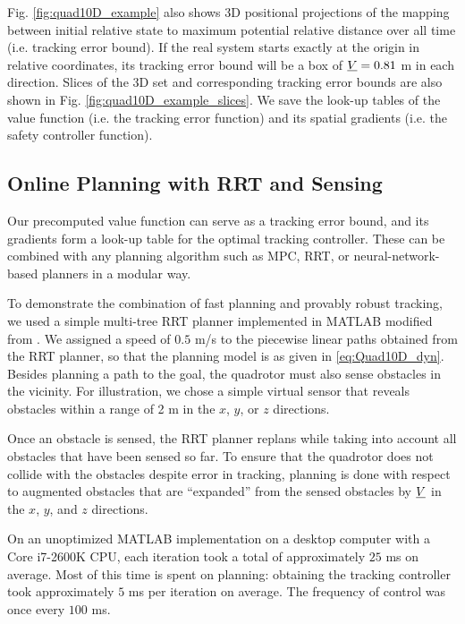 Fig. \ref{fig:quad10D_example} also shows 3D positional projections of the mapping between initial relative state to maximum potential relative distance over all time (i.e. tracking error bound). If the real system starts exactly at the origin in relative coordinates, its tracking error bound will be a box of $\underline{V} = 0.81$ m in each direction. Slices of the 3D set and corresponding tracking error bounds are also shown in Fig. \ref{fig:quad10D_example_slices}. We save the look-up tables of the value function (i.e. the tracking error function) and its spatial gradients (i.e. the safety controller function).

\subsection{Online Planning with RRT and Sensing}
Our precomputed value function can serve as a tracking error bound, and its gradients form a look-up table for the optimal tracking controller. These can be combined with any planning algorithm such as MPC, RRT, or neural-network-based planners in a modular way. 

To demonstrate the combination of fast planning and provably robust tracking, we used a simple multi-tree RRT planner implemented in MATLAB modified from \cite{Gavin2013}. We assigned a speed of $0.5$ m/s to the piecewise linear paths obtained from the RRT planner, so that the planning model is as given in \eqref{eq:Quad10D_dyn}. Besides planning a path to the goal, the quadrotor must also sense obstacles in the vicinity. For illustration, we chose a simple virtual sensor that reveals obstacles within a range of 2 m in the $x$, $y$, or $z$ directions.

Once an obstacle is sensed, the RRT planner replans while taking into account all obstacles that have been sensed so far. To ensure that the quadrotor does not collide with the obstacles despite error in tracking, planning is done with respect to augmented obstacles that are ``expanded'' from the sensed obstacles by $\underline{V}$ in the $x$, $y$, and $z$ directions.

On an unoptimized MATLAB implementation on a desktop computer with a Core i7-2600K CPU, each iteration took a total of approximately $25$ ms on average. Most of this time is spent on planning: obtaining the tracking controller took approximately $5$ ms per iteration on average. The frequency of control was once every $100$ ms.

